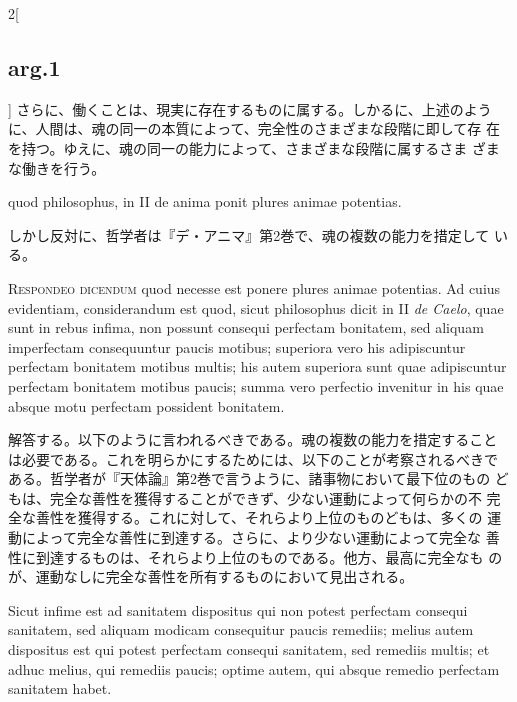 \documentclass[paper=a4paper,fontsize=10pt,jafontsize=9pt,titlepage]{jlreq}
\begin{document}
\begin{paracol}{2}[\subsection{arg.1}]
 さらに、働くことは、現実に存在するものに属する。しかるに、上述のよう
 に、人間は、魂の同一の本質によって、完全性のさまざまな段階に即して存
 在を持つ。ゆえに、魂の同一の能力によって、さまざまな段階に属するさま
 ざまな働きを行う。


 quod philosophus, in II de anima ponit
 plures animae potentias.

 \switchcolumn

しかし反対に、哲学者は『デ・アニマ』第2巻で、魂の複数の能力を措定して
いる。


 {\scshape Respondeo dicendum} quod necesse est ponere plures animae
 potentias. Ad cuius evidentiam, considerandum est quod, sicut
 philosophus dicit in II {\itshape de Caelo}, quae sunt in rebus
 infima, non possunt consequi perfectam bonitatem, sed aliquam
 imperfectam consequuntur paucis motibus; superiora vero his
 adipiscuntur perfectam bonitatem motibus multis; his autem superiora
 sunt quae adipiscuntur perfectam bonitatem motibus paucis; summa vero
 perfectio invenitur in his quae absque motu perfectam possident
 bonitatem.


 \switchcolumn

解答する。以下のように言われるべきである。魂の複数の能力を措定すること
は必要である。これを明らかにするためには、以下のことが考察されるべきで
ある。哲学者が『天体論』第2巻で言うように、諸事物において最下位のもの
どもは、完全な善性を獲得することができず、少ない運動によって何らかの不
完全な善性を獲得する。これに対して、それらより上位のものどもは、多くの
運動によって完全な善性に到達する。さらに、より少ない運動によって完全な
善性に到達するものは、それらより上位のものである。他方、最高に完全なも
のが、運動なしに完全な善性を所有するものにおいて見出される。

 \switchcolumn*


 Sicut infime est ad sanitatem dispositus qui non potest
 perfectam consequi sanitatem, sed aliquam modicam consequitur paucis
 remediis; melius autem dispositus est qui potest perfectam consequi
 sanitatem, sed remediis multis; et adhuc melius, qui remediis paucis;
 optime autem, qui absque remedio perfectam sanitatem habet.
 

\end{paracol}
\end{document}
